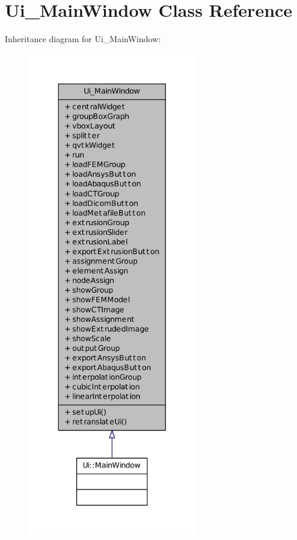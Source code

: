 \hypertarget{class_ui___main_window}{
\section{Ui\_\-MainWindow Class Reference}
\label{class_ui___main_window}
}


Inheritance diagram for Ui\_\-MainWindow:
\nopagebreak
\begin{figure}[H]
\begin{center}
\leavevmode
\includegraphics[height=600pt]{class_ui___main_window__inherit__graph}
\end{center}
\end{figure}

